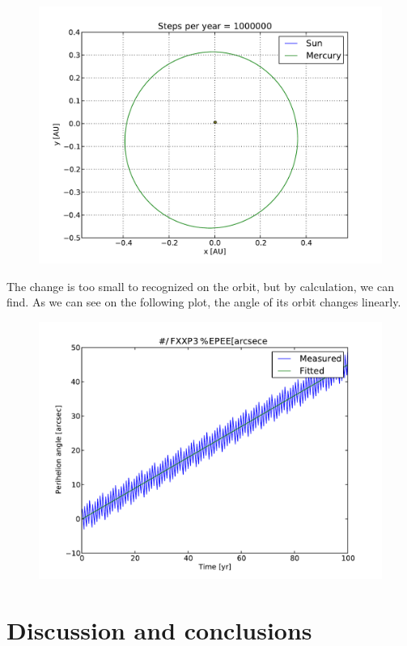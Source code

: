 \documentclass[10pt]{article}
\begin{document}
\begin{multicols}{2}
\begin{figure}[H]
    \centering
    \includegraphics[width=1.0\linewidth]{../results/MercuryOrbit.pdf}
    \label{fig:name}
\end{figure}
The change is too small to recognized on the orbit, but by calculation, we
can find. As we can see on the following plot, the angle of its orbit
changes linearly.
\begin{figure}[H]
    \centering
    \includegraphics[width=1.0\linewidth]{../results/peri_precession}
    \label{fig:name}
\end{figure}


\section{Discussion and conclusions}


\end{multicols}
\end{document}
